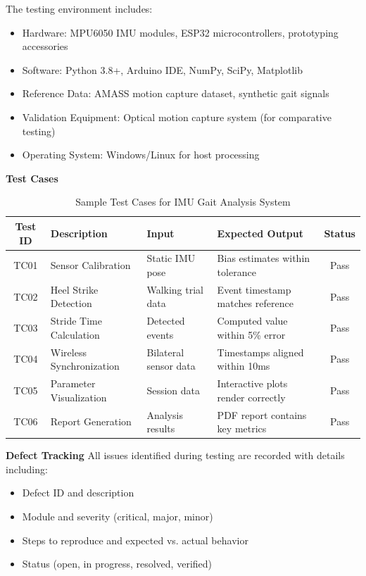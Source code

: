 \documentclass[12pt,a4paper]{report}
\begin{document}
The testing environment includes:
\begin{itemize}
    \item Hardware: MPU6050 IMU modules, ESP32 microcontrollers, prototyping accessories
    \item Software: Python 3.8+, Arduino IDE, NumPy, SciPy, Matplotlib
    \item Reference Data: AMASS motion capture dataset, synthetic gait signals
    \item Validation Equipment: Optical motion capture system (for comparative testing)
    \item Operating System: Windows/Linux for host processing
\end{itemize}

\textbf{Test Cases}

\begin{table}[h]
\centering
\caption{Sample Test Cases for IMU Gait Analysis System}
\begin{tabular}{|c|p{3cm}|p{3cm}|p{3cm}|c|}
\hline
\textbf{Test ID} & \textbf{Description} & \textbf{Input} & \textbf{Expected Output} & \textbf{Status} \\
\hline
TC01 & Sensor Calibration & Static IMU pose & Bias estimates within tolerance & Pass \\
\hline
TC02 & Heel Strike Detection & Walking trial data & Event timestamp matches reference & Pass \\
\hline
TC03 & Stride Time Calculation & Detected events & Computed value within 5\% error & Pass \\
\hline
TC04 & Wireless Synchronization & Bilateral sensor data & Timestamps aligned within 10ms & Pass \\
\hline
TC05 & Parameter Visualization & Session data & Interactive plots render correctly & Pass \\
\hline
TC06 & Report Generation & Analysis results & PDF report contains key metrics & Pass \\
\hline
\end{tabular}
\end{table}

\textbf{Defect Tracking}
All issues identified during testing are recorded with details including:
\begin{itemize}
    \item Defect ID and description
    \item Module and severity (critical, major, minor)
    \item Steps to reproduce and expected vs. actual behavior
    \item Status (open, in progress, resolved, verified)
\end{itemize}
\end{document}
